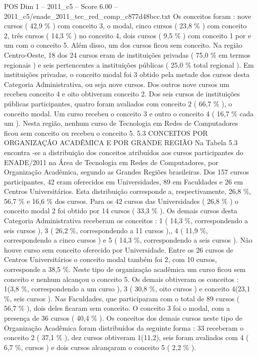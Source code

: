 \begin{textsample}{POS Dim 1 – 2011\_c5 – Score 6.00 – 2011\_c5/enade\_2011\_tec\_red\_comp\_c877d48bcc.txt}
Os conceitos foram : nove cursos ( 42,9 \% ) com conceito 3, o modal, cinco cursos ( 23,8 \% ) com conceito 2, três cursos ( 14,3 \% ) no conceito 4, dois cursos ( 9,5 \% ) com conceito 1 por e um com o conceito 5.
Além disso, um dos cursos ficou sem conceito.
Na região Centro-Oeste, 18 dos 24 cursos eram de instituições privadas ( 75,0 \% em termos regionais ) e seis pertencentes a instituições públicas ( 25,0 \% total regional ).
Em instituições privadas, o conceito modal foi 3 obtido pela metade dos cursos desta Categoria Administrativa, ou seja nove cursos.
Dos outros nove cursos um recebeu conceito 4 e oito obtiveram conceito 2.
Dos seis cursos de instituições públicas participantes, quatro foram avaliados com conceito 2 ( 66,7 \% ), o conceito modal.
Um curso recebeu o conceito 3 e outro o conceito 4 ( 16,7 \% cada um ).
Nesta região, nenhum curso de Tecnologia em Redes de Computadores ficou sem conceito ou recebeu o conceito 5. 5.3 CONCEITOS POR ORGANIZAÇÃO ACADÊMICA E POR GRANDE REGIÃO Na Tabela 5.3 encontra -se a distribuição dos conceitos atribuídos aos cursos participantes do ENADE/2011 na Área de Tecnologia em Redes de Computadores, por Organização Acadêmica, segundo as Grandes Regiões brasileiras.
Dos 157 cursos participantes, 42 eram oferecidos em Universidades, 89 em Faculdades e 26 em Centros Universitários.
Esta distribuição corresponde a, respectivamente, 26,8 \%, 56,7 \% e 16,6 \% dos cursos.
Para os 42 cursos das Universidades ( 26,8 \% ) o conceito modal 2 foi obtido por 14 cursos ( 33,3 \% ).
Os demais cursos desta Categoria Administrativa receberam os conceitos : 1 ( 14,3 \%, correspondendo a seis cursos ), 3 ( 26,2 \%, correspondendo a 11 cursos ),, 4 ( 11,9 \%, correspondendo a cinco cursos ) e 5 ( 14,3 \%, correspondendo a seis cursos ).
Não houve curso sem conceito oferecido por Universidade.
Entre os 26 cursos de Centros Universitários o conceito modal também foi 2, com 10 cursos, corresponde a 38,5 \%.
Neste tipo de organização acadêmica um curso ficou sem conceito e nenhum alcançou o conceito 5.
Os demais obtiveram os conceitos : 1(3,8 \%, correspondendo a um curso ), 3 ( 30,8 \%, oito cursos ) e conceito 4(23,1 \%, seis cursos ).
Nas Faculdades, que participaram com o total de 89 cursos ( 56,7 \% ), dois deles ficaram sem conceito.
O conceito 3 foi o modal, com a presença de 36 cursos ( 40,4 \% ).
Os conceitos dos demais cursos neste tipo de Organização Acadêmica foram distribuídos da seguinte forma : 33 receberam o conceito 2 ( 37,1 \% ), dez cursos obtiveram 1(11,2), seis foram avaliados com 4 ( 6,7 \%, cursos ) e dois cursos alcançaram o conceito 5 ( 2,2 \% ).

\end{textsample}
